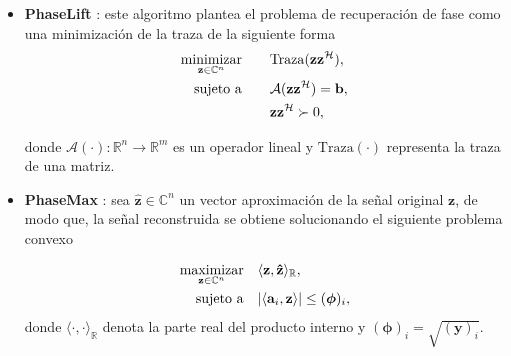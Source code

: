 \begin{itemize}
    \item \textbf{PhaseLift }:
    este algoritmo plantea el problema de recuperación de fase como una minimización de la traza de la siguiente forma
    \begin{equation}
        \begin{aligned}
            \operatorname*{minimizar}_{\mathbf{z} \in \mathbb{C}^{n}} \quad & \quad \mathrm{Traza}(\mathbf{z}\mathbf{z}^{\mathcal{H}}), \\
            \operatorname*{sujeto \ a} \quad & \quad \mathcal{A}(\mathbf{z}\mathbf{z}^{\mathcal{H}}) = \mathbf{b}, \\
             &\quad  \mathbf{z}\mathbf{z}^{\mathcal{H}} \succ 0,
        \end{aligned}
    \end{equation}
    
    donde $\mathcal{A}( \cdot ): \mathbb{R}^{n} \rightarrow \mathbb{R}^{m}$ es un operador lineal y $\mathrm{Traza}(\cdot)$ representa la traza de una matriz.
    
    \item \textbf{PhaseMax} :
    sea $\mathbf{\hat{z}} \in \mathbb{C}^{n}$ un vector aproximación de la señal original $\mathbf{z}$, de modo que, la señal reconstruida se obtiene solucionando el siguiente problema convexo
        
    \begin{equation}
        \begin{aligned}
            \operatorname*{maximizar}_{\mathbf{z}\in \mathbb{C}^n} \quad & \langle \mathbf{z}, \mathbf{\hat{z}} \rangle_{\mathbb{R}}, \\
            \operatorname*{sujeto \ a} \quad & \vert \langle \mathbf{a}_i,\mathbf{z} \rangle \vert \leq (\boldsymbol{\phi})_i,
        \end{aligned}
    \end{equation}
    donde $\langle \cdot, \cdot \rangle_{\mathbb{R}}$ denota la parte real del producto interno y $(\boldsymbol{\phi})_i = \sqrt{(\mathbf{y})_i}$.
    
\end{itemize}

